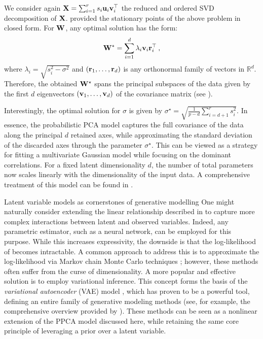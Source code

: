 We consider again ${\mathbf{X}} = \sum_{i=1}^{r} s_i {\mathbf{u}}_i {\mathbf{v}}_i^\top$ the reduced and ordered SVD decomposition of ${\mathbf{X}}$. \cite{tipping1999probabilistic} provided the stationary points of the above problem in closed form. For ${\mathbf{W}}$, any optimal solution has the form:
\begin{align}
    {\mathbf{W}}^* = \sum_{i=1}^d \lambda_i {\mathbf{v}}_i {\mathbf{r}}_i^\top \:,
\end{align}
where $\lambda_i = \sqrt{s_i^{2} - \sigma^{2}}$ and $({\mathbf{r}}_1, \dots, {\mathbf{r}}_d)$ is any orthonormal family of vectors in $\mathbb{R}^d$. Therefore, the obtained ${\mathbf{W}}^\star$ spans the principal subspaces of the data given by the first $d$ eigenvectors $({\mathbf{v}}_1, \dots, {\mathbf{v}}_d)$ of the covariance matrix (see ).

Interestingly, the optimal solution for $\sigma$ is given by $\sigma^\star = \sqrt{\frac{1}{p-d} \sum_{i=d+1}^{r} s^2_i}$. In essence, the probabilistic PCA model captures the full covariance of the data along the principal $d$ retained axes, while approximating the standard deviation of the discarded axes through the parameter $\sigma^\star$. This can be viewed as a strategy for fitting a multivariate Gaussian model while focusing on the dominant correlations. For a fixed latent dimensionality $d$, the number of total parameters now scales linearly with the dimensionality of the input data. A comprehensive treatment of this model can be found in \citep{bishop2006pattern}.

\begin{mem1}{Latent variable models as cornerstones of generative modelling}
    One might naturally consider extending the linear relationship described in  to capture more complex interactions between latent and observed variables. Indeed, any parametric estimator, such as a neural network, can be employed for this purpose. 
    While this increases expressivity, the downside is that the log-likelihood of  becomes intractable. A common approach to address this is to approximate the log-likelihood via Markov chain Monte Carlo techniques \citep{andrieu2003introduction}; however, these methods often suffer from the curse of dimensionality. A more popular and effective solution is to employ variational inference.
    This concept forms the basis of the \emph{variational autoencoder} (VAE) model \citep{kingma2013auto}, which has proven to be a powerful tool, defining an entire family of generative modeling methods (see, for example, the comprehensive overview provided by \cite{tomczak2021latent}). These methods can be seen as a nonlinear extension of the PPCA model discussed here, while retaining the same core principle of leveraging a prior over a latent variable.
\end{mem1}


